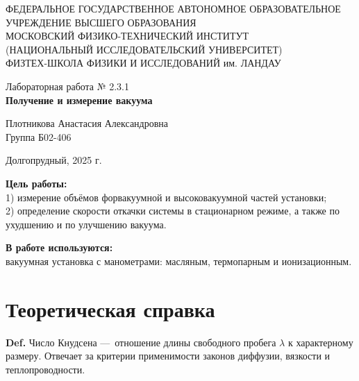 \documentclass[a4paper,12pt]{article} %
\begin{document}
\begin{center}
	\footnotesize{ФЕДЕРАЛЬНОЕ ГОСУДАРСТВЕННОЕ АВТОНОМНОЕ ОБРАЗОВАТЕЛЬНОЕ 			УЧРЕЖДЕНИЕ ВЫСШЕГО ОБРАЗОВАНИЯ}\\
	\footnotesize{МОСКОВСКИЙ ФИЗИКО-ТЕХНИЧЕСКИЙ ИНСТИТУТ\\(НАЦИОНАЛЬНЫЙ 			ИССЛЕДОВАТЕЛЬСКИЙ УНИВЕРСИТЕТ)}\\
	\footnotesize{ФИЗТЕХ-ШКОЛА ФИЗИКИ И ИССЛЕДОВАНИЙ им. ЛАНДАУ\\}
	\hfill \break
	\hfill \break
	\hfill \break
	\hfill \break
\end{center}

\begin{center}   
    \hfill \break
	\hfill \break
	\hfill \break
	\hfill \break    \hfill \break
	\hfill \break
	\hfill \break
	\hfill \break
    \hfill \break
    \hfill \break
	\hfill \break
	\large{Лабораторная работа № 2.3.1 \\\textbf{Получение и измерение вакуума}}\\
	\begin{flushright}
		Плотникова Анастасия Александровна\\
		Группа Б02-406
	\end{flushright}
	\hfill \break
	\hfill \break
	\hfill \break
\end{center}
\hfill \break
\hfill \break
\hfill \break
\hfill \break
\hfill \break
\hfill \break
\hfill \break
\hfill \break
\hfill \break
\hfill \break
\hfill \break
\hfill \break
\hfill \break
\begin{center}
	Долгопрудный, 2025 г.
\end{center}
\thispagestyle{empty}
\newpage
	\textbf{Цель работы:}\\ 
  1) измерение объёмов форвакуумной и высоковакуумной частей установки; \\
  2) определение скорости откачки системы в стационарном режиме, а также по ухудшению и по улучшению вакуума.
	\hfill \break
	
	\textbf{В работе используются:}\\ 
  вакуумная установка с манометрами: масляным, термопарным и ионизационным.
	
\section*{Теоретическая справка}

\textbf{Def.} Число Кнудсена — отношение длины свободного пробега $\lambda$ к характерному размеру. Отвечает за критерии применимости законов диффузии, вязкости и теплопроводности.
\end{document}
